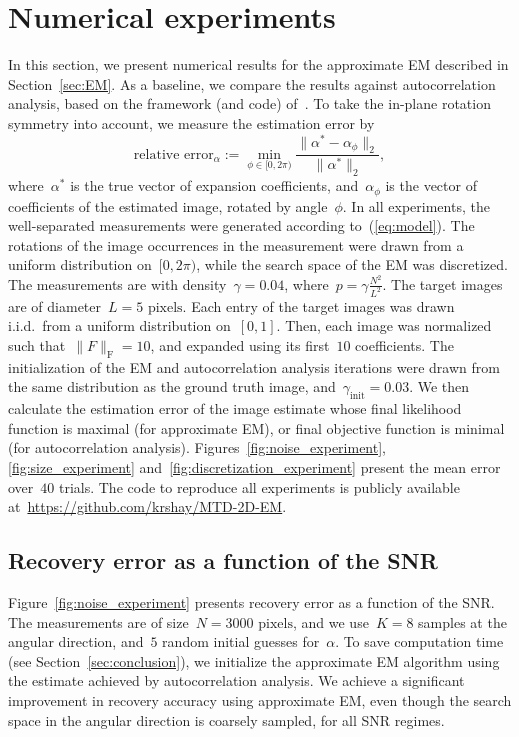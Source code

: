 \documentclass{article}
\begin{document}
\section{Numerical experiments}
\label{sec:numeric}
In this section, we present numerical results for the approximate EM described in Section~\ref{sec:EM}. As a baseline, we compare the results against autocorrelation analysis, based on the framework (and code) of~\cite{bendory2021multi, kreymer2021two}. To take the in-plane rotation symmetry into account, we measure the estimation error by
\begin{equation}
\label{eq:err_z}
\text{relative error}_{\alpha} := \min_{\phi \in [0, 2\pi)} \frac{\|\alpha^* - \alpha_{\phi}\|_2}{\|\alpha^*\|_2},
\end{equation}
where~$\alpha^*$ is the true vector of expansion coefficients, and~$\alpha_{\phi}$ is the vector of coefficients of the estimated image, rotated by angle~$\phi$. In all experiments, the well-separated measurements were generated according to~(\ref{eq:model}). The rotations of the image occurrences in the measurement were drawn from a uniform distribution on~$[0, 2\pi)$, while the search space of the EM was discretized. The measurements are with density~\mbox{$\gamma = 0.04$}, where~\mbox{$p = \gamma \frac{N^2}{L^2}$}. The target images are of diameter~\mbox{$L = 5 \text{ pixels}$}. Each entry of the target images was drawn i.i.d.\ from a uniform distribution on~$[0,1]$. Then, each image was normalized such that~\mbox{$\|F\|_\text{F} = 10$}, and expanded using its first~$10$ coefficients. The initialization of the EM and autocorrelation analysis iterations were drawn from the same distribution as the ground truth image, and~\mbox{$\gamma_{\text{init}} = 0.03$}. We then calculate the estimation error of the image estimate whose final likelihood function is maximal (for approximate EM), or final objective function is minimal (for autocorrelation analysis). Figures~\ref{fig:noise_experiment}, \ref{fig:size_experiment} and~\ref{fig:discretization_experiment} present the mean error over~$40$ trials. The code to reproduce all experiments is publicly available at~\url{https://github.com/krshay/MTD-2D-EM}.

\subsection{Recovery error as a function of the SNR}
\label{subsec:exp_SNR}
Figure~\ref{fig:noise_experiment} presents recovery error as a function of the SNR. The measurements are of size~\mbox{$N = 3000 \text{ pixels}$}, and we use~\mbox{$K = 8$} samples at the angular direction, and~$5$ random initial guesses for~$\alpha$. To save computation time (see Section~\ref{sec:conclusion}), we initialize the approximate EM algorithm using the estimate achieved by autocorrelation analysis. We achieve a significant improvement in recovery accuracy using approximate EM, even though the search space in the angular direction is coarsely sampled, for all SNR regimes.
\end{document}
